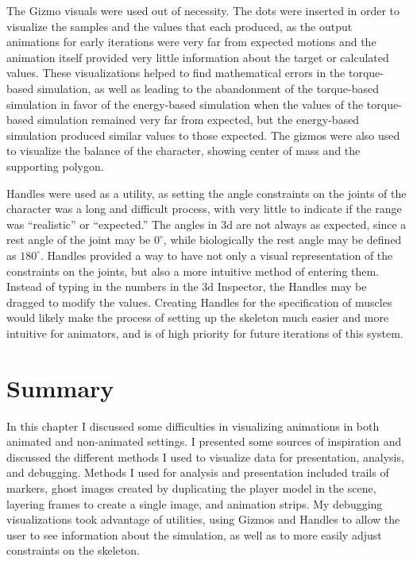 The Gizmo visuals were used out of necessity.  The dots were inserted in order to visualize the samples and the values that each produced, as the output animations for early iterations were very far from expected motions and the animation itself provided very little information about the target or calculated values.  These visualizations helped to find mathematical errors in the torque-based simulation, as well as leading to the abandonment of the torque-based simulation in favor of the energy-based simulation when the values of the torque-based simulation remained very far from expected, but the energy-based simulation produced similar values to those expected.  The gizmos were also used to visualize the balance of the character, showing center of mass and the supporting polygon.

Handles were used as a utility, as setting the angle constraints on the joints of the character was a long and difficult process, with very little to indicate if the range was ``realistic'' or ``expected.'' The angles in \unity3d{} are not always as expected, since a rest angle of the joint may be $0^\circ$, while biologically the rest angle may be defined as $180^\circ$.  Handles provided a way to have not only a visual representation of the constraints on the joints, but also a more intuitive method of entering them.  Instead of typing in the numbers in the \unity3d{} Inspector, the Handles may be dragged to modify the values.  Creating Handles for the specification of muscles would likely make the process of setting up the skeleton much easier and more intuitive for animators, and is of high priority for future iterations of this system.

\section{Summary}
In this chapter I discussed some difficulties in visualizing animations in both animated and non-animated settings.  I presented some sources of inspiration and discussed the different methods I used to visualize data for presentation, analysis, and debugging.  Methods I used for analysis and presentation included trails of markers, ghost images created by duplicating the player model in the scene, layering frames to create a single image, and animation strips.  My debugging visualizations took advantage of \unity{} utilities, using Gizmos and Handles to allow the user to see information about the simulation, as well as to more easily adjust constraints on the skeleton.
\label{section:vis_summary}
